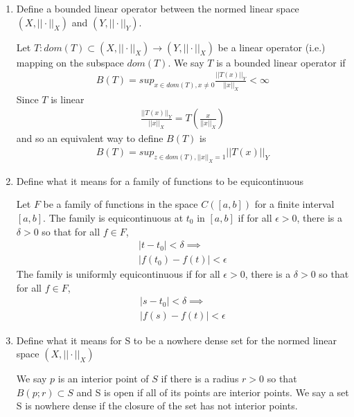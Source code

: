 \documentclass[11pt]{SelfArxOneColBMN}
\begin{document}
\begin{enumerate}
  \item Define a bounded linear operator between the normed linear space $(X,||\cdot||_X)$ and $(Y,||\cdot||_Y)$.
  \begin{solution}
    Let $T: dom(T) \subset (X,||\cdot||_X) \rightarrow (Y,||\cdot||_X)$ be a linear operator (i.e.) mapping on the subspace $dom(T)$. We say $T$ is a bounded linear operator if
    \begin{eqnarray*}
      B(T) = sup_{x\in dom(T), x\neq0} \frac{||T(x)||_Y}{||x||_X} < \infty
    \end{eqnarray*}
    Since $T$ is linear
    \begin{eqnarray*}
      \frac{||T(x)||_Y}{||x||_X} = T(\frac{x}{||x||_X})
    \end{eqnarray*}
    and so an equivalent way to define $B(T)$ is
    \begin{eqnarray*}
      B(T) = sup_{z\in dom(T),||x||_X = 1}||T(x)||_Y
    \end{eqnarray*}
  \end{solution}
  \item Define what it means for a family of functions to be equicontinuous
  \begin{solution}
    Let $F$ be a family of functions in the space $C([a,b])$ for a finite interval $[a,b]$. The family is equicontinuous at $t_0$ in $[a,b]$ if for all $\epsilon > 0$, there is a $\delta > 0$ so that for all $f \in F$,
    \begin{eqnarray*}
      |t - t_0| < \delta \implies \\
      |f(t_0) - f(t)| < \epsilon
    \end{eqnarray*}
    The family is uniformly equicontinuous if for all $\epsilon > 0$, there is a $\delta > 0$ so that for all $f \in F$,
    \begin{eqnarray*}
      |s - t_0| < \delta \implies\\
      |f(s) - f(t)| < \epsilon
    \end{eqnarray*}
  \end{solution}
  \item Define what it means for S to be a nowhere dense set for the normed linear space $(X,||\cdot||_X)$
  \begin{solution}
    We say $p$ is an interior point of $S$ if there is a radius $r > 0$ so that $B(p;r) \subset S$ and S is open if all of its points are interior points. We say a set S is nowhere dense if the closure of the set has not interior points.
  \end{solution}
  \begin{solution}

  \end{solution}
\end{enumerate}
\end{document}
